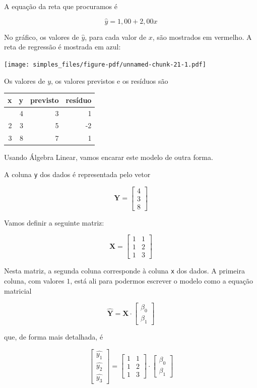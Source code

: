 \documentclass[
  letterpaper,
  DIV=11,
  numbers=noendperiod]{scrreprt}
\begin{document}
A equação da reta que procuramos é

\[
\hat y = 1{,}00 + 2{,}00 x
\]

No gráfico, os valores de $\hat y$, para cada valor de $x$, são
mostrados em vermelho. A reta de regressão é mostrada em azul:

\begin{center}
\texttt{[image: simples\_files/figure-pdf/unnamed-chunk-21-1.pdf]}
\end{center}

Os valores de $y$, os valores previstos e os resíduos são

\begin{longtable*}{rrrr}
\toprule
x & y & previsto & resíduo \\ 
\midrule{} & 4 & 3 & 1 \\ 
2 & 3 & 5 & -2 \\ 
3 & 8 & 7 & 1 \\ 
\bottomrule
\end{longtable*}

Usando Álgebra Linear, vamos encarar este modelo de outra forma.

A coluna \texttt{y} dos dados é representada pelo vetor

\[
\mathbf{Y} = \begin{bmatrix}
  4 \\ 3 \\ 8
\end{bmatrix}
\]

Vamos definir a seguinte matriz:

\[
\mathbf{X} = \begin{bmatrix}
  1 & 1 \\ 1 & 2 \\ 1 & 3
\end{bmatrix}
\]

Nesta matriz, a segunda coluna corresponde à coluna \texttt{x} dos
dados. A primeira coluna, com valores $1$, está ali para podermos
escrever o modelo como a equação matricial

\[
\mathbf{\widehat{Y}} = \mathbf{X} \cdot \begin{bmatrix}
  \beta_0 \\ \beta_1
\end{bmatrix}
\]

que, de forma mais detalhada, é

\[
\begin{bmatrix}
  \widehat{y_1} \\ \widehat{y_2} \\ \widehat{y_3}
\end{bmatrix}
=
\begin{bmatrix}
  1 & 1 \\ 1 & 2 \\ 1 & 3
\end{bmatrix}
\cdot \begin{bmatrix}
  \beta_0 \\ \beta_1
\end{bmatrix}
\]
\end{document}
